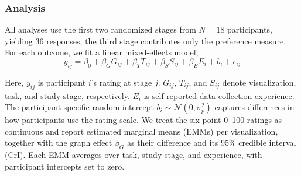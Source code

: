 \documentclass[letterpaper, 10 pt, conference]{ieeeconf}
\begin{document}
\subsubsection{Analysis}

All analyses use the first two randomized stages from \(N=18\) participants, yielding 36 responses; the third stage contributes only the preference measure. For each outcome, we fit a linear mixed-effects model,
\begin{equation}
    y_{ij} = \beta_0 + \beta_G G_{ij} + \beta_T T_{ij} + \beta_S S_{ij} + \beta_E E_i + b_i + \epsilon_{ij}
    \label{eq:user-study-mixed-model}
\end{equation}


Here, \(y_{ij}\) is participant \(i\)'s rating at stage \(j\). \(G_{ij}\), \(T_{ij}\), and \(S_{ij}\) denote visualization, task, and study stage, respectively. \(E_i\) is self-reported data-collection experience. The participant-specific random intercept \(b_i \sim \mathcal{N}(0,\sigma_p^2)\) captures differences in how participants use the rating scale. We treat the six-point 0--100 ratings as continuous and report estimated marginal means (EMMs) per visualization, together with the graph effect \(\beta_G\) as their difference and its 95\% credible interval (CrI). Each EMM averages over task, study stage, and experience, with participant intercepts set to zero.
\end{document}
